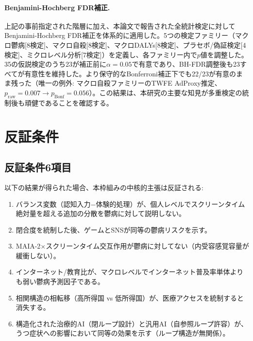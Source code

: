 \documentclass[a4paper,11pt,titlepage]{article}
\begin{document}
\paragraph{Benjamini-Hochberg FDR補正.}
上記の事前指定された階層に加え、本論文で報告された全統計検定に対してBenjamini-Hochberg FDR補正を体系的に適用した。5つの検定ファミリー（マクロ鬱病[8検定]、マクロ自殺[8検定]、マクロDALYs[8検定]、プラセボ/偽証検定[4検定]、ミクロレベル分析[7検定]）を定義し、各ファミリー内で$p$値を調整した。35の仮説検定のうち23が補正前に$\alpha = 0.05$で有意であり、BH-FDR調整後も23すべてが有意性を維持した。より保守的なBonferroni補正下でも22/23が有意のまま残った（唯一の例外: マクロ自殺ファミリーのTWFE AdProxy推定、$p_{\text{raw}} = 0.007 \rightarrow p_{\text{Bonf}} = 0.056$）。この結果は、本研究の主要な知見が多重検定の統制後も頑健であることを確認する。


\section{反証条件}\label{sec:falsification}

\subsection{反証条件6項目}

以下の結果が得られた場合、本枠組みの中核的主張は反証される:

\begin{enumerate}[label=\Roman*.]
  \item バランス変数（認知入力$-$体験的処理）が、個人レベルでスクリーンタイム絶対量を超える追加の分散を鬱病に対して説明しない。
  \item 閉合度を統制した後、ゲームとSNSが同等の鬱病リスクを示す。
  \item MAIA-2$\times$スクリーンタイム交互作用が鬱病に対してない（内受容感覚容量が緩衝しない）。
  \item インターネット/教育比が、マクロレベルでインターネット普及率単体よりも弱い鬱病予測因子である。
  \item 相関構造の相転移（高所得国 vs 低所得国）が、医療アクセスを統制すると消失する。
  \item 構造化された治療的AI（閉ループ設計）と汎用AI（自参照ループ許容）が、うつ症状への影響において同等の効果を示す（ループ構造が無関係）。
\end{enumerate}
\end{document}
